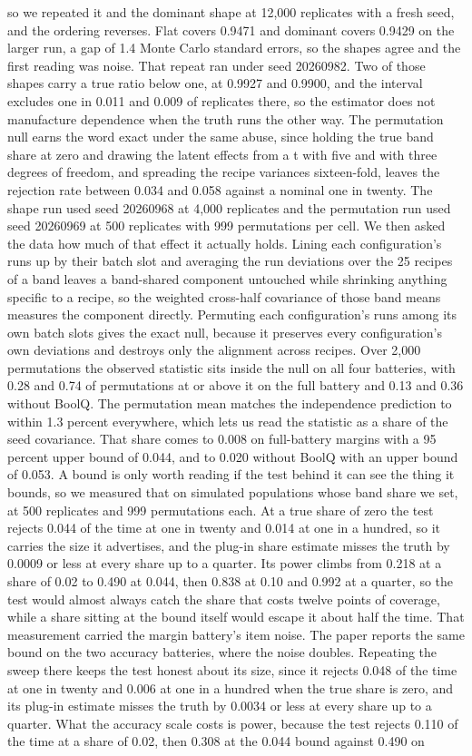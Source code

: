 so we repeated it and the dominant shape at 12,000 replicates with a fresh seed, and the ordering reverses. Flat covers 0.9471 and dominant covers 0.9429 on the larger run, a gap of 1.4 Monte Carlo standard errors, so the shapes agree and the first reading was noise. That repeat ran under seed 20260982. Two of those shapes carry a true ratio below one, at 0.9927 and 0.9900, and the interval excludes one in 0.011 and 0.009 of replicates there, so the estimator does not manufacture dependence when the truth runs the other way. The permutation null earns the word exact under the same abuse, since holding the true band share at zero and drawing the latent effects from a t with five and with three degrees of freedom, and spreading the recipe variances sixteen-fold, leaves the rejection rate between 0.034 and 0.058 against a nominal one in twenty. The shape run used seed 20260968 at 4,000 replicates and the permutation run used seed 20260969 at 500 replicates with 999 permutations per cell. We then asked the data how much of that effect it actually holds. Lining each configuration's runs up by their batch slot and averaging the run deviations over the 25 recipes of a band leaves a band-shared component untouched while shrinking anything specific to a recipe, so the weighted cross-half covariance of those band means measures the component directly. Permuting each configuration's runs among its own batch slots gives the exact null, because it preserves every configuration's own deviations and destroys only the alignment across recipes. Over 2,000 permutations the observed statistic sits inside the null on all four batteries, with 0.28 and 0.74 of permutations at or above it on the full battery and 0.13 and 0.36 without BoolQ. The permutation mean matches the independence prediction to within 1.3 percent everywhere, which lets us read the statistic as a share of the seed covariance. That share comes to 0.008 on full-battery margins with a 95 percent upper bound of 0.044, and to 0.020 without BoolQ with an upper bound of 0.053. A bound is only worth reading if the test behind it can see the thing it bounds, so we measured that on simulated populations whose band share we set, at 500 replicates and 999 permutations each. At a true share of zero the test rejects 0.044 of the time at one in twenty and 0.014 at one in a hundred, so it carries the size it advertises, and the plug-in share estimate misses the truth by 0.0009 or less at every share up to a quarter. Its power climbs from 0.218 at a share of 0.02 to 0.490 at 0.044, then 0.838 at 0.10 and 0.992 at a quarter, so the test would almost always catch the share that costs twelve points of coverage, while a share sitting at the bound itself would escape it about half the time. That measurement carried the margin battery's item noise. The paper reports the same bound on the two accuracy batteries, where the noise doubles. Repeating the sweep there keeps the test honest about its size, since it rejects 0.048 of the time at one in twenty and 0.006 at one in a hundred when the true share is zero, and its plug-in estimate misses the truth by 0.0034 or less at every share up to a quarter. What the accuracy scale costs is power, because the test rejects 0.110 of the time at a share of 0.02, then 0.308 at the 0.044 bound against 0.490 on 